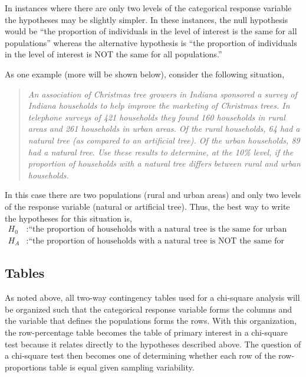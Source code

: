 \documentclass[10pt,openany]{book}\usepackage[]{graphicx}\usepackage[]{color}
\begin{document}
In instances where there are only two levels of the categorical response variable the hypotheses may be slightly simpler.  In these instances, the null hypothesis would be ``the proportion of individuals in the level of interest is the same for all populations'' whereas the alternative hypothesis is ``the proportion of individuals in the level of interest is NOT the same for all populations.''

As one example (more will be shown below), consider the following situation,

\begin{quote}
\textsl{An association of Christmas tree growers in Indiana sponsored a survey of Indiana households to help improve the marketing of Christmas trees.  In telephone surveys of 421 households they found 160 households in rural areas and 261 households in urban areas.  Of the rural households, 64 had a natural tree (as compared to an artificial tree).  Of the urban households, 89 had a natural tree.  Use these results to determine, at the 10\% level, if the proportion of households with a natural tree differs between rural and urban households.}
\end{quote}

In this case there are two populations (rural and urban areas) and only two levels of the response variable (natural or artificial tree).  Thus, the best way to write the hypotheses for this situation is,
\[ \begin{split}
  H_{0}&: \text{``the proportion of households with a natural tree is the same for urban and rural households''} \\
  H_{A}&: \text{``the proportion of households with a natural tree is NOT the same for urban and rural households''}
\end{split} \]


\subsection{Tables}
As noted above, all two-way contingency tables used for a chi-square analysis will be organized such that the categorical response variable forms the columns and the variable that defines the populations forms the rows.  With this organization, the row-percentage table becomes the table of primary interest in a chi-square test because it relates directly to the hypotheses described above.  The question of a chi-square test then becomes one of determining whether each row of the row-proportions table is equal given sampling variability.
\end{document}
